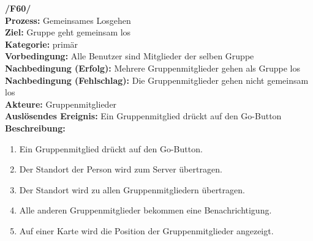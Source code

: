 \documentclass{article}
\begin{document}
\textbf{/F60/} \\
\textbf{Prozess:} Gemeinsames Losgehen \\
\textbf{Ziel:} Gruppe geht gemeinsam los \\
\textbf{Kategorie:} primär \\
\textbf{Vorbedingung:} Alle Benutzer sind Mitglieder der selben Gruppe \\
\textbf{Nachbedingung (Erfolg):} Mehrere Gruppenmitglieder gehen als Gruppe los\\
\textbf{Nachbedingung (Fehlschlag):} Die Gruppenmitglieder gehen nicht gemeinsam los\\
\textbf{Akteure:} Gruppenmitglieder \\
\textbf{Auslösendes Ereignis:} Ein Gruppenmitglied drückt auf den Go-Button\\
\textbf{Beschreibung:}
\begin{enumerate}
\setlength{\itemsep}{0pt}
\item Ein Gruppenmitglied drückt auf den Go-Button.
\item Der Standort der Person wird zum Server übertragen.
\item Der Standort wird zu allen Gruppenmitgliedern übertragen.
\item Alle anderen Gruppenmitglieder bekommen eine Benachrichtigung.
\item Auf einer Karte wird die Position der Gruppenmitglieder angezeigt.
\end{enumerate}

\end{document}
